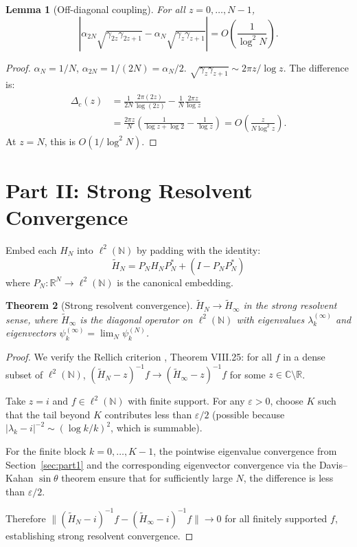 \documentclass[11pt,a4paper]{article}
\newtheorem{theorem}{Theorem}[section]
\newtheorem{lemma}[theorem]{Lemma}
\theoremstyle{definition}
\begin{document}
\begin{lemma}[Off-diagonal coupling]\label{lem:coupling}
For all $z = 0,\ldots,N-1$,
\[
|\alpha_{2N}\sqrt{\gamma_{2z}\gamma_{2z+1}} -
  \alpha_N\sqrt{\gamma_z\gamma_{z+1}}|
= O\!\left(\frac{1}{\log^2 N}\right).
\]
\end{lemma}

\begin{proof}
$\alpha_N = 1/N$, $\alpha_{2N} = 1/(2N) = \alpha_N/2$.
$\sqrt{\gamma_z\gamma_{z+1}} \sim 2\pi z/\log z$. The difference is:
\begin{align*}
\Delta_c(z) &= \frac{1}{2N}\frac{2\pi(2z)}{\log(2z)} -
               \frac{1}{N}\frac{2\pi z}{\log z} \\
&= \frac{2\pi z}{N}\!\left(\frac{1}{\log z + \log 2} - \frac{1}{\log z}\right)
= O\!\left(\frac{z}{N\log^2 z}\right).
\end{align*}
At $z = N$, this is $O(1/\log^2 N)$.
\end{proof}

\section{Part II: Strong Resolvent Convergence}
\label{sec:part2}

Embed each $H_N$ into $\ell^2(\mathbb{N})$ by padding with the identity:
\[
\widetilde{H}_N = P_N H_N P_N^* + (I - P_N P_N^*)
\]
where $P_N: \mathbb{R}^N \to \ell^2(\mathbb{N})$ is the canonical
embedding.

\begin{theorem}[Strong resolvent convergence]\label{thm:sr}
$\widetilde{H}_N \to \widetilde{H}_\infty$ in the strong resolvent
sense, where $\widetilde{H}_\infty$ is the diagonal operator on
$\ell^2(\mathbb{N})$ with eigenvalues $\lambda_k^{(\infty)}$ and
eigenvectors $\psi_k^{(\infty)} = \lim_N \psi_k^{(N)}$.
\end{theorem}

\begin{proof}
We verify the Rellich criterion \cite{reed1980}, Theorem VIII.25:
for all $f$ in a dense subset of $\ell^2(\mathbb{N})$,
$(\widetilde{H}_N - z)^{-1}f \to (\widetilde{H}_\infty - z)^{-1}f$
for some $z \in \mathbb{C}\setminus\mathbb{R}$.

Take $z = i$ and $f \in \ell^2(\mathbb{N})$ with finite support.
For any $\varepsilon > 0$, choose $K$ such that the tail beyond $K$
contributes less than $\varepsilon/2$ (possible because
$|\lambda_k - i|^{-2} \sim (\log k/k)^2$, which is summable).

For the finite block $k = 0,\ldots,K-1$, the pointwise eigenvalue
convergence from Section~\ref{sec:part1} and the corresponding
eigenvector convergence via the Davis--Kahan $\sin\theta$ theorem
ensure that for sufficiently large $N$, the difference is less than
$\varepsilon/2$.

Therefore $\|(\widetilde{H}_N - i)^{-1}f - (\widetilde{H}_\infty -
i)^{-1}f\| \to 0$ for all finitely supported $f$, establishing strong
resolvent convergence.
\end{proof}
\end{document}
